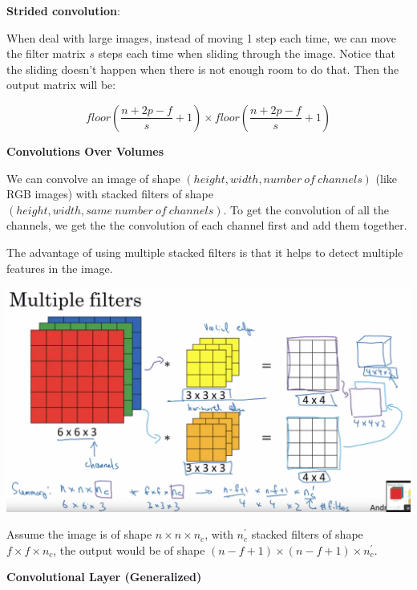 \documentclass{article}
\begin{document}
\noindent \textbf{Strided convolution}:

\noindent When deal with large images, instead of moving 1 step each time, we can move the filter matrix \(s\) steps each time when sliding through the image. Notice that the sliding doesn't happen when there is not enough room to do that. Then the output matrix will be:

\[floor(\frac{n + 2p - f}{s}  + 1) \times floor(\frac{n + 2p - f}{s} + 1)\]

\noindent \textbf{Convolutions Over Volumes}

\noindent We can convolve an image of shape \((height, width, number \ of \ channels)\) (like RGB images) with stacked filters of shape \((height, width, same \ number \ of \ channels)\). To get the convolution of all the channels, we get the the convolution of each channel first and add them together.

\bigskip

\noindent The advantage of using multiple stacked filters is that it helps to detect multiple features in the image.

\begin{center}
\includegraphics[scale=0.2]{./images/convolutions_over_volumes.png}
\end{center}

\noindent Assume the image is of shape \(n \times n \times n_{c}\), with \(n_{c}^{'}\) stacked filters of shape \(f \times f \times n_{c}\), the output would be of shape \((n - f + 1) \times (n - f + 1) \times n_{c}^{'}\).

\bigskip

\noindent \textbf{Convolutional Layer (Generalized)}
\end{document}
